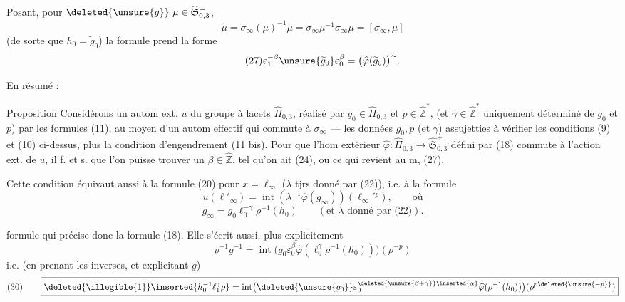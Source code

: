 Posant, pour $\deleted{\unsure{g}}\ \mu\in
\widehat{\mathfrak S}_{0,3}^{+}$,
\[
\tag{26}
\widetilde\mu=\sigma_\infty(\mu)^{-1}\mu
=\sigma_\infty\mu^{-1}\sigma_\infty\mu=[\sigma_\infty,\mu]
\]
(de sorte que $h_0=\widetilde g_0$) la formule  prend la forme
\[
\tag{27}
\varepsilon_1^{-\beta}\unsure{\widetilde g_0}\varepsilon_0^\beta
=\bigl(\widehat\varphi(\widetilde g_0)\bigr)^{\sim}.
\]


En résumé :

\uline{Proposition} Considérons un autom ext. $u$ du groupe à lacets
$\widehat\Pi_{0,3}$, réalisé par $g_0\in\widehat\Pi_{0,3}$
et $p\in\widehat{\mathbb Z}^{*}$,
(et $\gamma\in\widehat{\mathbb Z}^{*}$ uniquement déterminé
 de $g_0$ et $p$)
par les formules (11), au moyen d'un autom effectif
 qui commute à $\sigma_\infty$ ---
les données $g_0,p$ (et $\gamma$)  
assujetties à vérifier les conditions (9) et (10) ci-dessus,
plus la condition d'engendrement (11 bis).
Pour que l'hom extérieur
$\widehat\varphi:\widehat\Pi_{0,3}\longrightarrow
\widehat{\mathfrak S}_{0,3}^{+}$
défini par (18) commute à l'action ext. de $u$,
il f. et s. que l'on puisse trouver un $\beta\in\widehat{\mathbb Z}$,
tel qu'on ait (24), ou ce qui revient au $\overline{\mathrm m}$, (27),

Cette condition  équivaut aussi à la formule
(20) pour $x=\ell_\infty$ ($\lambda$  tjrs donné par (22)),
 i.e. à la formule
\[
\tag{28}
u(\ell'_\infty)=\operatorname{int}(\lambda^{-1}\widehat\varphi(g_\infty))
 (\ell_\infty'{}^p),\qquad\text{où}
\]
\[
\tag{29}
g_\infty=g_0\ell_0^{-\gamma}\rho^{-1}(h_0)
\qquad(\text{et }\lambda\text{ donné par (22)}).
\]


formule qui précise donc la formule  (18). Elle s'écrit aussi, plus explicitement
\[
\rho^{-1}g^{-1}
=\operatorname{int}\bigl(g_0\varepsilon_0^{\beta}
\widehat\varphi(\ell_0^{\gamma}\rho^{-1}(h_0))\bigr)
(\rho^{-p})
\]
i.e. (en prenant les inverses, et explicitant $g$)
\[
(30)\qquad
\boxed{
\deleted{\illegible{1}}\inserted{h_0^{-1}\ell_1^{\gamma}\rho}
=\operatorname{int}\bigl(
\deleted{\unsure{g_0}}\varepsilon_0^{\deleted{\unsure{\beta+\gamma}}\inserted{\alpha}}
\widehat\varphi(\rho^{-1}(h_0))\bigr)
(\rho^{p\deleted{\unsure{-p}}})
}
\]

